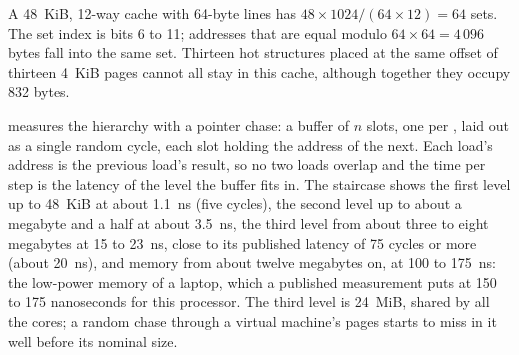 \begin{omfigure}

\label{fig:ll:memory-hierarchy-and-caches:split}
\end{omfigure}

\begin{example}\label{ex:ll:memory-hierarchy-and-caches:geometry}
A 48~KiB, 12-way cache with 64-byte lines has $48 \times 1024 / (64 \times 12) = 64$ sets. The set index is bits 6 to
11; addresses that are equal modulo $64 \times 64 = 4\,096$ bytes fall into the same set. Thirteen hot structures placed
at the same offset of thirteen 4~KiB pages cannot all stay in this cache, although together they occupy 832 bytes.
\end{example}

 measures the hierarchy with a pointer chase: a buffer of $n$ slots, one
per , laid out as a single random cycle, each slot holding the address of the next. Each load's address is
the previous load's result, so no two loads overlap and the time per step is the latency of the level the buffer fits
in. The staircase shows the first level up to 48~KiB at about \qty{1.1}{\nano\second} (five cycles), the second
level up to about a megabyte and a half at about \qty{3.5}{\nano\second}, the third level from about three to eight
megabytes at 15 to \qty{23}{\nano\second}, close to its published latency of 75 cycles or more (about
\qty{20}{\nano\second}), and memory from about twelve megabytes on, at 100 to \qty{175}{\nano\second}: the
low-power memory of a laptop, which a published measurement puts at 150 to 175 nanoseconds for this processor. The
third level is 24~MiB, shared by all the cores; a random chase through a virtual machine's pages starts to miss in it
well before its nominal size.

